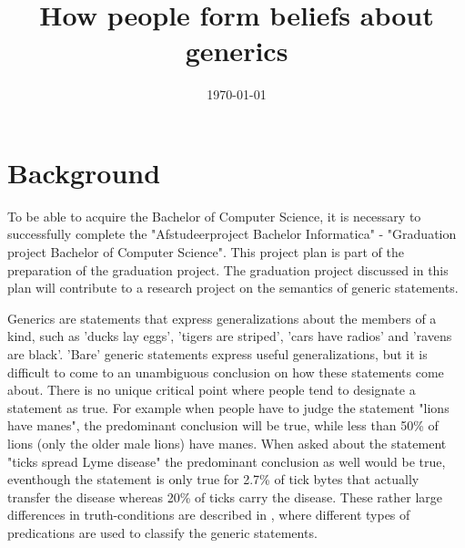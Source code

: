 \documentclass{uva-inf-article}
\title{How people form beliefs about generics}
\date{\today}
\begin{document}
\maketitle


\section{Background}
To be able to acquire the Bachelor of Computer Science, it is necessary to successfully complete the "Afstudeerproject Bachelor Informatica" - "Graduation project Bachelor of Computer Science". This project plan is part of the preparation of the graduation project. The graduation project discussed in this plan will contribute to a research project on the semantics of generic statements.

Generics are statements that express generalizations about the members of a kind, such as 'ducks lay eggs', 'tigers are striped', 'cars have radios' and 'ravens are black'. 'Bare' generic statements express useful generalizations, but it is difficult to come to an unambiguous conclusion on how these statements come about. There is no unique critical point where people tend to designate a statement as true. For example when people have to judge the statement "lions have manes", the predominant conclusion will be true, while less than 50\% of lions (only the older male lions) have manes. When asked about the statement "ticks spread Lyme disease" the predominant conclusion as well would be true, eventhough the statement is only true for 2.7\% \parencite{rivm_2019} of tick bytes that actually transfer the disease whereas 20\% of ticks carry the disease. These rather large differences in truth-conditions are described in \cite{leslie2011all}, where different types of predications are used to classify the generic statements.

\newpage
\end{document}
